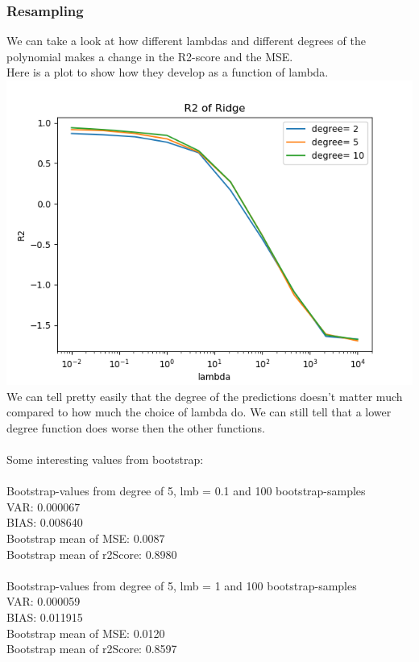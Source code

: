\documentclass[a4paper,norsk]{article}
\begin{document}
\subsubsection{Resampling}
We can take a look at how different lambdas and different degrees of the polynomial makes a change in the R2-score and the MSE.
\\Here is a plot to show how they develop as a function of lambda.
\\ \includegraphics[scale=.7]{R2Ridge}
\\ We can tell pretty easily that the degree of the predictions doesn't matter much compared to how much the choice of lambda do. We can still tell that a lower degree function does worse then the other functions.
\\
\\Some interesting values from bootstrap:
\\
\\Bootstrap-values from degree of 5, lmb = 0.1 and 100 bootstrap-samples
\\VAR: 0.000067
\\BIAS: 0.008640
\\Bootstrap mean of MSE: 0.0087
\\Bootstrap mean of r2Score: 0.8980
\\
\\Bootstrap-values from degree of 5, lmb = 1 and 100 bootstrap-samples
\\VAR: 0.000059
\\BIAS: 0.011915
\\Bootstrap mean of MSE: 0.0120
\\Bootstrap mean of r2Score: 0.8597
\end{document}
